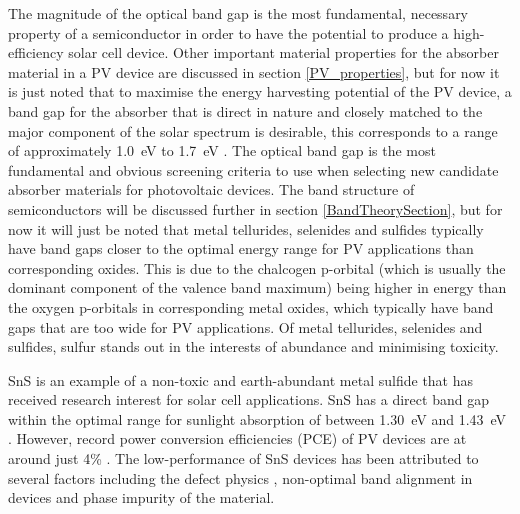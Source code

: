 \documentclass[11pt, twoside]{report}
\begin{document}
The magnitude of the optical band gap is the most fundamental, necessary property of a semiconductor in order to have the potential to produce a high-efficiency solar cell device. Other important material properties for the absorber material in a PV device are discussed in section \ref{PV_properties}, but for now it is just noted that to maximise the energy harvesting potential of the PV device, a band gap for the absorber that is direct in nature and closely matched to the major component of the solar spectrum is desirable, this corresponds to a range of approximately \SI{1.0}{eV} to \SI{1.7}{eV} \cite{PV_E_range}. The optical band gap is the most fundamental and obvious screening criteria to use when selecting new candidate absorber materials for photovoltaic devices. The band structure of semiconductors will be discussed further in section \ref{BandTheorySection}, but for now it will just be noted that metal tellurides, selenides and sulfides typically have band gaps closer to the optimal energy range for PV applications than corresponding oxides. This is due to the chalcogen p-orbital (which is usually the dominant component of the valence band maximum) being higher in energy than the oxygen p-orbitals in corresponding metal oxides, which typically have band gaps that are too wide for PV applications. Of metal tellurides, selenides and sulfides, sulfur stands out in the interests of abundance and minimising toxicity.

SnS is an example of a non-toxic and earth-abundant metal sulfide that has received research interest for solar cell applications. SnS has a direct band gap within the optimal range for sunlight absorption of between \SI{1.30}{eV} \cite{Lee_thesis_59} and \SI{1.43}{eV} \cite{Lee_thesis_60}. However, record power conversion efficiencies (PCE) of PV devices are at around just 4\% \cite{SnS_record}. The low-performance of SnS devices has been attributed to several factors including the defect physics \cite{Lee_SnS_defects}, non-optimal band alignment in devices \cite{Lee_SnS_band} and phase impurity \cite{Lee_SnS_phases} of the material.
\end{document}
